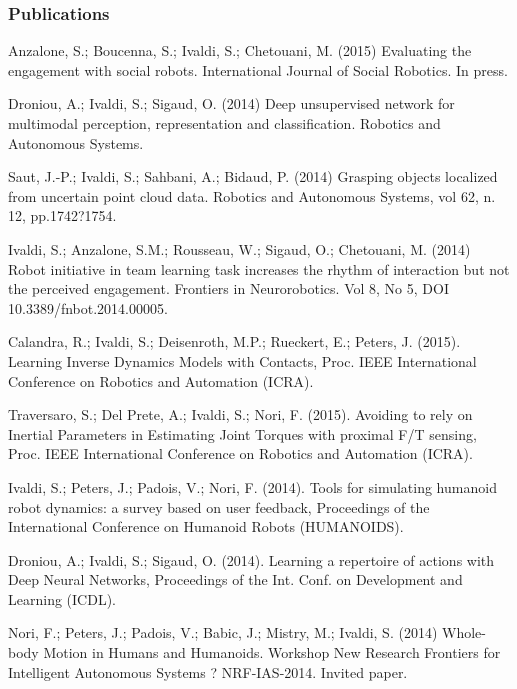 \subsubsection{Publications}
Anzalone, S.; Boucenna, S.; Ivaldi, S.; Chetouani, M. (2015) Evaluating the engagement with social robots. International Journal of Social Robotics. In press.

Droniou, A.; Ivaldi, S.; Sigaud, O.  (2014) Deep unsupervised network for multimodal perception, representation and classification. Robotics and Autonomous Systems.

Saut, J.-P.; Ivaldi, S.; Sahbani, A.; Bidaud, P.  (2014) Grasping objects localized from uncertain point cloud data. Robotics and Autonomous Systems, vol 62, n. 12, pp.1742?1754.

Ivaldi, S.; Anzalone, S.M.; Rousseau, W.; Sigaud, O.; Chetouani, M. (2014) Robot initiative in team learning task increases the rhythm of interaction but not the perceived engagement. Frontiers in Neurorobotics. Vol 8, No 5, DOI 10.3389/fnbot.2014.00005.

Calandra, R.; Ivaldi, S.; Deisenroth, M.P.; Rueckert, E.; Peters, J. (2015). Learning Inverse Dynamics Models with Contacts, Proc. IEEE International Conference on Robotics and Automation (ICRA). 

Traversaro, S.; Del Prete, A.; Ivaldi, S.; Nori, F. (2015). Avoiding to rely on Inertial Parameters in Estimating Joint Torques with proximal F/T sensing, Proc. IEEE International Conference on Robotics and Automation (ICRA). 

Ivaldi, S.; Peters, J.; Padois, V.; Nori, F. (2014). Tools for simulating humanoid robot dynamics: a survey based on user feedback, Proceedings of the International Conference on Humanoid Robots (HUMANOIDS).

Droniou, A.; Ivaldi, S.; Sigaud, O. (2014). Learning a repertoire of actions with Deep Neural Networks, Proceedings of the Int. Conf. on Development and Learning (ICDL).

Nori, F.;  Peters, J.; Padois, V.; Babic, J.; Mistry, M.; Ivaldi, S.  (2014) Whole-body Motion in Humans and Humanoids. Workshop New Research Frontiers for Intelligent Autonomous Systems ? NRF-IAS-2014. Invited paper.


